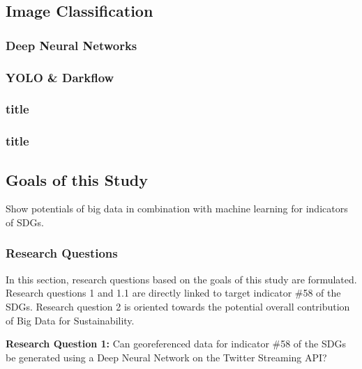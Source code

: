 			
			
		\subsection{Image Classification}
			\subsubsection{Deep Neural Networks}
			
			\subsubsection{YOLO \& Darkflow}
			
			\subsubsection{title}
			
			\subsubsection{title}
			
			
			
		\subsection{Goals of this Study}
		
		Show potentials of big data in combination with machine learning for indicators of SDGs.
		
		
		
			\subsubsection{Research Questions}
			
			In this section, research questions based on the goals of this study are formulated. Research questions 1 and 1.1 are directly linked to target indicator \#58 of the SDGs. Research question 2 is oriented towards the potential overall contribution of Big Data for Sustainability.
			
			\bigskip
			
			\begin{tcolorbox}
				\textbf{Research Question 1:} \smallskip Can georeferenced data for indicator \#58 of the SDGs be generated using a Deep Neural Network on the Twitter Streaming API?
			\end{tcolorbox}
			
